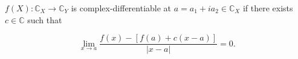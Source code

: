 $f(X): \mathbb{C}_X \to \mathbb{C}_Y$ is complex-differentiable at $a = a_1 + i a_2 \in \mathbb{C}_X$ if there exists $c \in \mathbb{C}$ such that

$$\lim_{x \to a} \frac{f(x) - [f(a) + c(x - a)]}{|x - a|} = 0.$$

